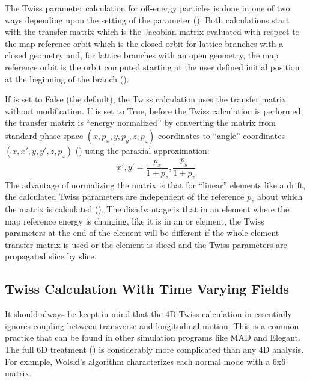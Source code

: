 The Twiss parameter calculation for off-energy particles is done in one of two ways depending upon
the setting of the  parameter  ().  Both
calculations start with the transfer matrix which is the Jacobian matrix evaluated with respect
to the map reference orbit which is the closed orbit for lattice branches with a closed
geometry and, for lattice branches with an open geometry, the map reference orbit is the orbit computed
starting at the user defined initial position at the beginning of the branch ().

If  is set to False (the default), the Twiss calculation uses the transfer
matrix without modification. If  is set to True, before the Twiss calculation is
performed, the transfer matrix is ``energy normalized'' by converting the matrix from \bmad standard
phase space $(x, p_x, y, p_y, z, p_z)$ coordinates to ``angle'' coordinates $(x, x', y, y', z, p_z)$
() using the paraxial approximation:
\begin{equation}
  x', y' = \frac{p_x}{1 + p_{z}}, \frac{p_y}{1 + p_z}
\end{equation}
The advantage of normalizing the matrix is that for ``linear'' elements like a drift, the calculated
Twiss parameters are independent of the reference $p_z$ about which the matrix is calculated
(\cite{b:carli}). The disadvantage is that in an element where the map reference energy is changing,
like it is in an  or  element, the Twiss parameters at the end of the element
will be different if the whole element transfer matrix is used or the element is sliced and the
Twiss parameters are propagated slice by slice.

\subsection{Twiss Calculation With Time Varying Fields}
\label{s:twiss.time}

It should always be keept in mind that the 4D Twiss calculation in \bmad essentially ignores coupling
between transverse and longitudinal motion. This is a common practice that can be found in other
simulation programs like MAD and Elegant. The full 6D treatment (\cite{b:wolski.coupling})
is considerably more complicated than any 4D analysis. For example, Wolski's algorithm characterizes
each normal mode with a 6x6 matrix.


